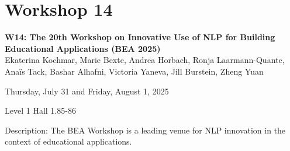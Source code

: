 \clearpage



\section[W14: The 20th Workshop on Innovative Use of NLP for Building Educational Applications (BEA 2025)]{Workshop 14}
\label{workshop_14}

\begin{center}
    {\Large \textbf{W14: The 20th Workshop on Innovative Use of NLP for Building Educational Applications (BEA 2025)}}\\
    

    Ekaterina Kochmar, Marie Bexte, Andrea Horbach, Ronja Laarmann-Quante, Anaïs Tack, Bashar Alhafni, Victoria Yaneva, Jill Burstein, Zheng Yuan
    
    Thursday, July 31 and Friday, August 1, 2025
    
    Level 1 Hall 1.85-86

\end{center}

Description: The BEA Workshop is a leading venue for NLP innovation in the context of educational applications.

